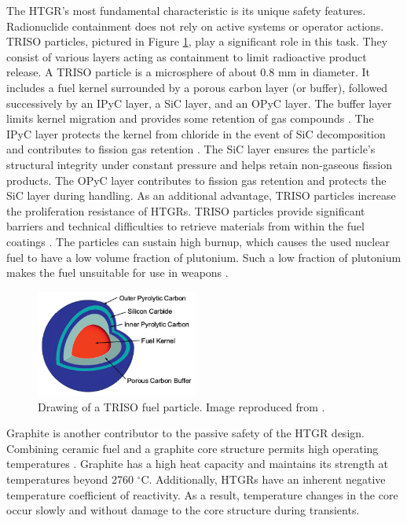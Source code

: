 The HTGR's most fundamental characteristic is its unique safety features.
Radionuclide containment does not rely on active systems or operator actions.
\gls{TRISO} particles, pictured in Figure \ref{fig:triso}, play a significant role in this task.
They consist of various layers acting as containment to limit radioactive product release.
A \gls{TRISO} particle is a microsphere of about 0.8 mm in diameter.
It includes a fuel kernel surrounded by a porous carbon layer (or buffer), followed successively by an \gls{IPyC} layer, a \gls{SiC} layer, and an \gls{OPyC} layer.
The buffer layer limits kernel migration and provides some retention of gas compounds \cite{oecd_nea_benchmark_2017}.
The \gls{IPyC} layer protects the kernel from chloride in the event of \gls{SiC} decomposition and contributes to fission gas retention \cite{demkowickz_paul_triso_2019}.
The \gls{SiC} layer ensures the particle's structural integrity under constant pressure and helps retain non-gaseous fission products.
The \gls{OPyC} layer contributes to fission gas retention and protects the \gls{SiC} layer during handling.
As an additional advantage, \gls{TRISO} particles increase the proliferation resistance of \glspl{HTGR}.
TRISO particles provide significant barriers and technical difficulties to retrieve materials from within the fuel coatings \cite{paviet-hartmann_analysis_2011}.
The particles can sustain high burnup, which causes the used nuclear fuel to have a low volume fraction of plutonium.
Such a low fraction of plutonium makes the fuel unsuitable for use in weapons \cite{paviet-hartmann_analysis_2011}.

\begin{figure}[htbp!]
	\centering
	\includegraphics[height=3.5cm]{figures/triso}
	\caption{Drawing of a TRISO fuel particle. Image reproduced from \cite{hales_multidimensional_2013}.}
	\label{fig:triso}
\end{figure}

Graphite is another contributor to the passive safety of the \gls{HTGR} design.
Combining ceramic fuel and a graphite core structure permits high operating temperatures \cite{ballinger_balance_2004}.
Graphite has a high heat capacity and maintains its strength at temperatures beyond 2760 $^{\circ}$C.
Additionally, HTGRs have an inherent negative temperature coefficient of reactivity.
As a result, temperature changes in the core occur slowly and without damage to the core structure during transients.

